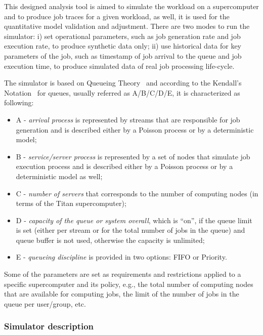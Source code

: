 This designed analysis tool is aimed to simulate the workload on a supercomputer and to produce job traces for a given workload, as well, it is used for the quantitative model validation and adjustment. There are two modes to run the simulator: i) set operational parameters, such as job generation rate and job execution rate, to produce synthetic data only; ii) use historical data for key parameters of the job, such as timestamp of job arrival to the queue and job execution time, to produce simulated data of real job processing life-cycle.

The simulator is based on Queueing Theory~\cite{ref-queueing-theory} and according to the Kendall's Notation~\cite{ref-kendall} for queues, usually referred as A/B/C/D/E, it is characterized as following:
\begin{itemize}
    \item A - \textit{arrival process} is represented by streams that are responsible for job generation and is described either by a Poisson process or by a deterministic model;
    \item B - \textit{service/server process} is represented by a set of nodes that simulate job execution process and is described either by a Poisson process or by a deterministic model as well;
    \item C - \textit{number of servers} that corresponds to the number of computing nodes (in terms of the Titan supercomputer);
    \item D - \textit{capacity of the queue or system overall}, which is ``on'', if the queue limit is set (either per stream or for the total number of jobs in the queue) and queue buffer is not used, otherwise the capacity is unlimited;
    \item E - \textit{queueing discipline} is provided in two options: FIFO or Priority.
\end{itemize}

Some of the parameters are set as requirements and restrictions applied to a specific supercomputer and its policy, e.g., the total number of computing nodes that are available for computing jobs, the limit of the number of jobs in the queue per user/group, etc.

\subsubsection{Simulator description} \label{sec-strategy-3-1}

